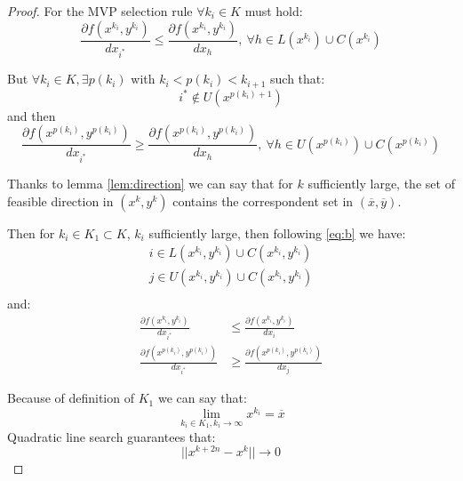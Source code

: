 \begin{proof}
For the MVP selection rule $\forall k_i \in K$ must hold:
\begin{equation}
 \frac{\partial f(x^{k_i},y^{k_i})}{dx_{i^*}} \le \frac{\partial f(x^{k_i},y^{k_i})}{dx_{h}}, \ \forall h \in L(x^{k_i}) \cup C(x^{k_i})
\end{equation}

But  $\forall k_i \in K,\exists p(k_i)$ with  $k_i <p(k_i)<k_{i+1}$ such that:
\begin{equation}
 i^* \not \in U(x^{p(k_i)+1})
\end{equation}
and then
\begin{equation}
 \frac{\partial f(x^{p(k_i)},y^{p(k_i)})}{dx_{i^*}} \ge \frac{\partial f(x^{p(k_i)},y^{p(k_i)})}{dx_{h}}, \ \forall h \in U(x^{p(k_i)}) \cup C(x^{p(k_i)})
\end{equation}


Thanks to lemma \ref{lem:direction} we can say that for $k$ sufficiently large, the set of feasible direction in $(x^k,y^k)$ contains the correspondent set in $(\overline{x},\overline{y})$.

Then for $k_i \in K_1 \subset K$, $k_i$ sufficiently large, then following \ref{eq:b} we have:
\begin{equation}
\begin{aligned}
i \in L(x^{k_i},y^{k_i}) \cup C(x^{k_i},y^{k_i})\\
j \in U(x^{k_i},y^{k_i}) \cup C(x^{k_i},y^{k_i})\\
\end{aligned}
\end{equation}
and:
\begin{equation}\label{eq:direction1}
\begin{aligned}
 \frac{\partial f(x^{k_i},y^{k_i})}{dx_{i^*}} &\le \frac{\partial f(x^{k_i},y^{k_i})}{dx_{i}}\\
 \frac{\partial f(x^{p(k_i)},y^{p(k_i)})}{dx_{i^*}} &\ge \frac{\partial f(x^{p(k_i)},y^{p(k_i)})}{dx_{j}}
 \end{aligned}
\end{equation}

Because of  definition of $K_1$ we can say that:
\begin{equation}
 \lim_{k_i \in K_1, k_i \rightarrow \infty} x^{k_i} =\overline{x}
\end{equation}
Quadratic line search guarantees that:
\begin{equation}
 ||x^{k+2n}-x^{k}|| \rightarrow 0
\end{equation}



\end{proof}
